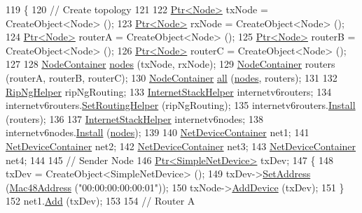 \begin{DoxyCode}
119 \{
120   \textcolor{comment}{// Create topology}
121 
122   \hyperlink{classns3_1_1Ptr}{Ptr<Node>} txNode = CreateObject<Node> ();
123   \hyperlink{classns3_1_1Ptr}{Ptr<Node>} rxNode = CreateObject<Node> ();
124   \hyperlink{classns3_1_1Ptr}{Ptr<Node>} routerA = CreateObject<Node> ();
125   \hyperlink{classns3_1_1Ptr}{Ptr<Node>} routerB = CreateObject<Node> ();
126   \hyperlink{classns3_1_1Ptr}{Ptr<Node>} routerC = CreateObject<Node> ();
127 
128   \hyperlink{classns3_1_1NodeContainer}{NodeContainer} \hyperlink{visualizer-ideas_8txt_a3e1b3808014a2c68ab0cd0182e041be2}{nodes} (txNode, rxNode);
129   \hyperlink{classns3_1_1NodeContainer}{NodeContainer} routers (routerA, routerB, routerC);
130   \hyperlink{classns3_1_1NodeContainer}{NodeContainer} \hyperlink{buildings__pathloss_8m_a00a349297fa58bc80ff5329e25dcfe28}{all} (\hyperlink{visualizer-ideas_8txt_a3e1b3808014a2c68ab0cd0182e041be2}{nodes}, routers);
131 
132   \hyperlink{classns3_1_1RipNgHelper}{RipNgHelper} ripNgRouting;
133   \hyperlink{classns3_1_1InternetStackHelper}{InternetStackHelper} internetv6routers;
134   internetv6routers.\hyperlink{classns3_1_1InternetStackHelper_a3e382c02df022dec79952a7eca8cd5ba}{SetRoutingHelper} (ripNgRouting);
135   internetv6routers.\hyperlink{classns3_1_1InternetStackHelper_a6645b412f31283d2d9bc3d8a95cebbc0}{Install} (routers);
136 
137   \hyperlink{classns3_1_1InternetStackHelper}{InternetStackHelper} internetv6nodes;
138   internetv6nodes.\hyperlink{classns3_1_1InternetStackHelper_a6645b412f31283d2d9bc3d8a95cebbc0}{Install} (\hyperlink{visualizer-ideas_8txt_a3e1b3808014a2c68ab0cd0182e041be2}{nodes});
139 
140   \hyperlink{classns3_1_1NetDeviceContainer}{NetDeviceContainer} net1;
141   \hyperlink{classns3_1_1NetDeviceContainer}{NetDeviceContainer} net2;
142   \hyperlink{classns3_1_1NetDeviceContainer}{NetDeviceContainer} net3;
143   \hyperlink{classns3_1_1NetDeviceContainer}{NetDeviceContainer} net4;
144 
145   \textcolor{comment}{// Sender Node}
146   \hyperlink{classns3_1_1Ptr}{Ptr<SimpleNetDevice>} txDev;
147   \{
148     txDev = CreateObject<SimpleNetDevice> ();
149     txDev->\hyperlink{classns3_1_1SimpleNetDevice_a968ef3e7318bac29d5f1d7d977029af4}{SetAddress} (\hyperlink{classns3_1_1Mac48Address}{Mac48Address} (\textcolor{stringliteral}{"00:00:00:00:00:01"}));
150     txNode->\hyperlink{classns3_1_1Node_a42ff83ee1d5d1649c770d3f5b62375de}{AddDevice} (txDev);
151   \}
152   net1.\hyperlink{classns3_1_1NetDeviceContainer_a7ca8bc1d7ec00fd4fcc63869987fbda5}{Add} (txDev);
153 
154   \textcolor{comment}{// Router A}

\end{DoxyCode}
